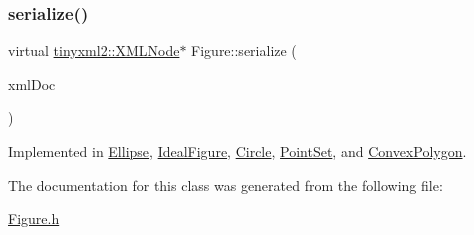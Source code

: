\subsubsection{\texorpdfstring{serialize()}{serialize()}}
{\footnotesize\ttfamily virtual \hyperlink{classtinyxml2_1_1_x_m_l_node}{tinyxml2\+::\+X\+M\+L\+Node}$\ast$ Figure\+::serialize (\begin{DoxyParamCaption}\item[{\hyperlink{classtinyxml2_1_1_x_m_l_document}{tinyxml2\+::\+X\+M\+L\+Document} \&}]{xml\+Doc }\end{DoxyParamCaption})\hspace{0.3cm}{\ttfamily [pure virtual]}}



Implemented in \hyperlink{class_ellipse_ab6c64b8c54cb74a4552a5f4f487f8d7d}{Ellipse}, \hyperlink{class_ideal_figure_a5a795a3de8992af3fb9cee4a904b31a5}{Ideal\+Figure}, \hyperlink{class_circle_a86fa86f49342a310db5e717c75011487}{Circle}, \hyperlink{class_point_set_a282360046d7566f50d1ceec49aca0d89}{Point\+Set}, and \hyperlink{class_convex_polygon_ab7cfd51933dd7a3bf821056c292ca62c}{Convex\+Polygon}.



The documentation for this class was generated from the following file\+:\begin{DoxyCompactItemize}
\item 
\hyperlink{_figure_8h}{Figure.\+h}\end{DoxyCompactItemize}
